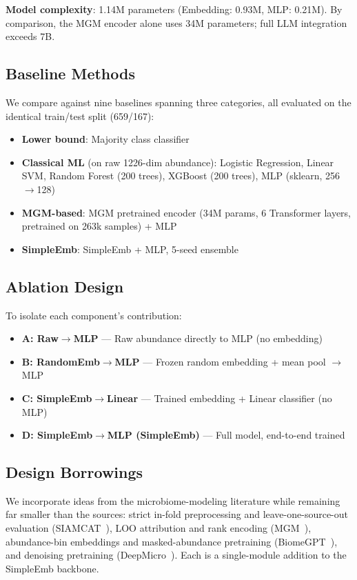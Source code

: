 \documentclass{article} %
\begin{document}
\textbf{Model complexity}: 1.14M parameters (Embedding: 0.93M, MLP: 0.21M). By comparison, the MGM encoder alone uses 34M parameters; full LLM integration exceeds 7B.

\subsection{Baseline Methods}

We compare against nine baselines spanning three categories, all evaluated on the identical train/test split (659/167):

\begin{itemize}
  \item \textbf{Lower bound}: Majority class classifier
  \item \textbf{Classical ML} (on raw 1226-dim abundance): Logistic Regression, Linear SVM, Random Forest (200 trees), XGBoost (200 trees), MLP (sklearn, 256$\rightarrow$128)
  \item \textbf{MGM-based}: MGM pretrained encoder (34M params, 6 Transformer layers, pretrained on 263k samples) + MLP
  \item \textbf{SimpleEmb}: SimpleEmb + MLP, 5-seed ensemble
\end{itemize}

\subsection{Ablation Design}

To isolate each component's contribution:
\begin{itemize}
  \item \textbf{A: Raw$\rightarrow$MLP} --- Raw abundance directly to MLP (no embedding)
  \item \textbf{B: RandomEmb$\rightarrow$MLP} --- Frozen random embedding + mean pool $\rightarrow$ MLP
  \item \textbf{C: SimpleEmb$\rightarrow$Linear} --- Trained embedding + Linear classifier (no MLP)
  \item \textbf{D: SimpleEmb$\rightarrow$MLP (SimpleEmb)} --- Full model, end-to-end trained
\end{itemize}

\subsection{Design Borrowings}

We incorporate ideas from the microbiome-modeling literature while remaining far smaller than the sources: strict in-fold preprocessing and leave-one-source-out evaluation (SIAMCAT~\citep{siamcat2021}), LOO attribution and rank encoding (MGM~\citep{mgm2024}), abundance-bin embeddings and masked-abundance pretraining (BiomeGPT~\citep{biomegpt2026}), and denoising pretraining (DeepMicro~\citep{deepmicro2020}). Each is a single-module addition to the SimpleEmb backbone.
\end{document}
